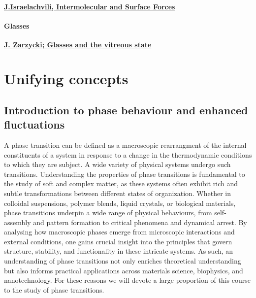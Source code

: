 \documentclass[
  letterpaper,
  enabledeprecatedfontcommands]{report}
\begin{document}
\textbf{\href{https://bris.on.worldcat.org/search/detail/961357167?queryString=\%20Intermolecular\%20and\%20Surface\%20Forces&clusterResults=true&stickyFacetsChecked=true&groupVariantRecords=false&newsArticles=off&bookReviews=off}{J.Israelachvili,
Intermolecular and Surface Forces}}

\subsection*{Glasses}\label{glasses}

\textbf{\href{https://bris.on.worldcat.org/search/detail/21975348?queryString=Glasses\%20and\%20the\%20vitreous\%20state&clusterResults=true&stickyFacetsChecked=true&groupVariantRecords=false&newsArticles=off&bookReviews=off}{J.
Zarzycki; Glasses and the vitreous state}}

\part{Unifying concepts}

\chapter{Introduction to phase behaviour and enhanced
fluctuations}\label{introduction-to-phase-behaviour-and-enhanced-fluctuations}

A phase transition can be defined as a macroscopic rearrangment of the
internal constituents of a system in response to a change in the
thermodynamic conditions to which they are subject. A wide variety of
physical systems undergo such transitions. Understanding the properties
of phase transitions is fundamental to the study of soft and complex
matter, as these systems often exhibit rich and subtle transformations
between different states of organization. Whether in colloidal
suspensions, polymer blends, liquid crystals, or biological materials,
phase transitions underpin a wide range of physical behaviours, from
self-assembly and pattern formation to critical phenomena and dynamical
arrest. By analysing how macroscopic phases emerge from microscopic
interactions and external conditions, one gains crucial insight into the
principles that govern structure, stability, and functionality in these
intricate systems. As such, an understanding of phase transitions not
only enriches theoretical understanding but also informs practical
applications across materials science, biophysics, and nanotechnology.
For these reasons we will devote a large proportion of this course to
the study of phase transitions.
\end{document}
